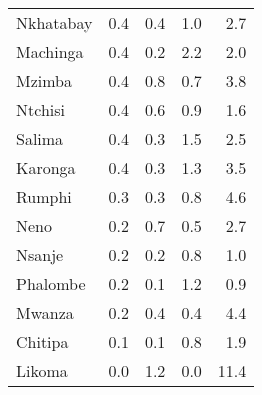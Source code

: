\begin{tabular}{lrrrr}
Nkhatabay      &      0.4 &               0.4 &      1.0 &               2.7 \\
Machinga       &      0.4 &               0.2 &      2.2 &               2.0 \\
Mzimba         &      0.4 &               0.8 &      0.7 &               3.8 \\
Ntchisi        &      0.4 &               0.6 &      0.9 &               1.6 \\
Salima         &      0.4 &               0.3 &      1.5 &               2.5 \\
Karonga        &      0.4 &               0.3 &      1.3 &               3.5 \\
Rumphi         &      0.3 &               0.3 &      0.8 &               4.6 \\
Neno           &      0.2 &               0.7 &      0.5 &               2.7 \\
Nsanje         &      0.2 &               0.2 &      0.8 &               1.0 \\
Phalombe       &      0.2 &               0.1 &      1.2 &               0.9 \\
Mwanza         &      0.2 &               0.4 &      0.4 &               4.4 \\
Chitipa        &      0.1 &               0.1 &      0.8 &               1.9 \\
Likoma         &      0.0 &               1.2 &      0.0 &              11.4 \\
\bottomrule
\end{tabular}
